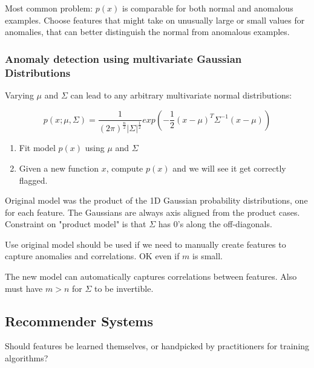 \documentclass{article}
\begin{document}
Most common problem: $p(x)$ is comparable for both normal and anomalous examples. Choose features that might take on unusually large or small values for anomalies, that can better distinguish the normal from anomalous examples.





\subsubsection{Anomaly detection using multivariate Gaussian Distributions}


Varying $\mu$ and $\Sigma$ can lead to any arbitrary multivariate normal distributions:

\begin{equation}
    p(x; \mu, \Sigma) = \frac{1}{(2 \pi)^{\frac{n}{2}} \vert \Sigma \vert ^{\frac{1}{2}}} exp \left( - \frac{1}{2} (x - \mu)^T \Sigma^{-1} (x - \mu) \right)
\end{equation}


\begin{enumerate}
    \item Fit model $p(x)$ using $\mu$ and $\Sigma$
    \item Given a new function $x$, compute $p(x)$ and we will see it get correctly flagged.
\end{enumerate}

Original model was the product of the 1D Gaussian probability distributions, one for each feature. The Gaussians are always axis aligned from the product cases. Constraint on "product model" is that $\Sigma$ has 0's along the off-diagonals. 

\hspace{1pt}


Use original model should be used if we need to manually create features to capture anomalies and correlations. OK even if $m$ is small.

The new model can automatically captures correlations between features. Also must have $m > n$ for $\Sigma$ to be invertible.








\subsection{Recommender Systems}

Should features be learned themselves, or handpicked by practitioners for training algorithms? 
\end{document}
